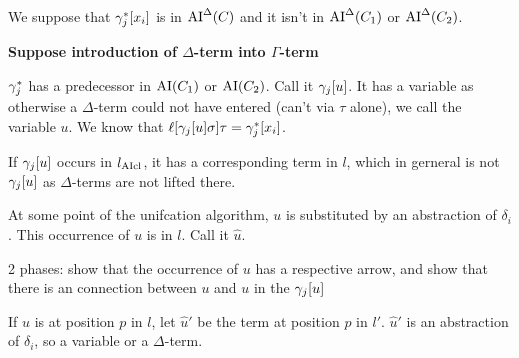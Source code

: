 \documentclass[,%
	paper=a4,%
	DIV14, %
	twoside=false,%
	liststotoc,
	bibtotoc,
	draft=false,%
	numbers=noendperiod
]{scrartcl}
\begin{document}
We suppose that $\gamma_j^*[x_i]$ is in $\operatorname{AI}^\Delta(C)$ and it isn't in $\operatorname{AI}^\Delta(C_1)$ or $\operatorname{AI}^\Delta(C_2)$.

{\bfseries Suppose introduction of $\Delta$-term into $\Gamma$-term}

$\gamma^*_j$ has a predecessor in $\operatorname{AI}(C_1)$ or $\operatorname{AI}(C_2)$. Call it $\gamma_j[u]$. It has a variable as otherwise a $\Delta$-term could not have entered (can't via $\tau$ alone), we call the variable $u$. We know that $\ell[\gamma_j[u] \sigma] \tau = \gamma^*_j[x_i]$.

If $\gamma_j[u]$ occurs in $l_{\operatorname{AIcl}}$, it has a corresponding term in $l$, which in gerneral is not $\gamma_j[u]$ as $\Delta$-terms are not lifted there.

At some point of the unifcation algorithm, $u$ is substituted by an abstraction of $\delta_i$.
This occurrence of $u$ is in $l$. Call it $\hat u$.

2 phases: show that the occurrence of $u$ has a respective arrow, and show that there is an connection between $u$ and $u$ in the $\gamma_j[u]$

If $\hat u$ is at position $p$ in $l$, let $\hat u'$ be the term at position $p$ in $l'$. $\hat u'$ is an abstraction of $\delta_i$, so a variable or a $\Delta$-term.
\end{document}

